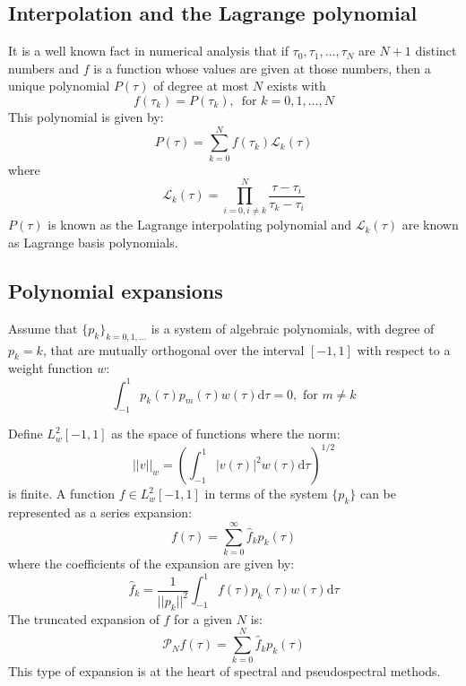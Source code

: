 \documentclass[a4paper,11pt]{report}    %
\begin{document}
\subsection{Interpolation and the Lagrange polynomial}

It is a well known fact in numerical analysis \cite{Burden:05} that if $\tau_0, \tau_1, \ldots, \tau_N$ are $N+1$ 
distinct numbers and $f$ is a function whose values are given at those numbers, then a unique
polynomial $P(\tau)$ of degree at most $N$ exists with
\[
   f(\tau_k) = P(\tau_k), \,\,\, \mathrm{for}\,\, k=0,1,\ldots,N
\]
This polynomial is given by:
\[
 P(\tau) = \sum \limits_{k=0}^N f(\tau_k) \mathcal{L}_k(\tau)
\]
where
\begin{equation} \label{eq:Lagrange_basis}
  \mathcal{L}_k(\tau) = \prod\limits_{i=0, i\ne k}^N \frac{ \tau- \tau_i}{\tau_k-\tau_i}
\end{equation}
$P(\tau)$ is known as the Lagrange interpolating polynomial and $\mathcal{L}_k(\tau)$ are known
as Lagrange basis polynomials.


\subsection{Polynomial expansions}

Assume that $\{p_k\}_{k=0, 1, \ldots}$ is a system of algebraic polynomials, with degree of $p_k=k$, that
are mutually orthogonal over the interval $[-1,1]$ with respect to a weight function $w$:
\[
  \int_{-1}^{1} p_k(\tau) p_m (\tau) w(\tau) \mathrm{d} \tau = 0, \,\, \mathrm{for}\,\, m \ne k
\]

Define $L_w^2[-1,1]$ as the space
of functions where the norm:
\[
   || v ||_w = \left( \int_{-1}^{1} | v(\tau) |^2 w(\tau) \mathrm{d} \tau \right) ^{1/2}
\]
is finite. A function $f \in L_w^2[-1,1]$ in terms of the system $\{p_k\}$ can
be represented as a series expansion:
\[
  f(\tau) =  \sum\limits_{k=0}^\infty \hat f_k p_k(\tau)
\]
where the coefficients of the expansion are given by:
\begin{equation} \label{eq:expansion_coefficients}
   \hat f_k = \frac{1}{||p_k||^2} \int_{-1}^{1} f(\tau) p_k(\tau) w(\tau) \mathrm{d} \tau
\end{equation}
The truncated  expansion of $f$ for a given $N$ is:
\[
   \mathcal{P}_N f(\tau) = \sum\limits_{k=0}^N \hat f_k p_k(\tau)
\]
This type of expansion is at the heart of spectral and pseudospectral methods. 


\end{document}
